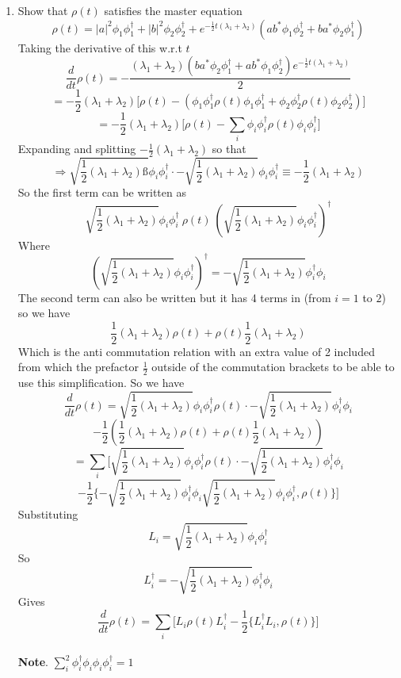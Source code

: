 \documentclass[12pt]{article}
\begin{document}
\begin{enumerate}
    \item Show that $\rho (t)$ satisfies the master equation 
    $$ \rho (t) = |a|^2 \phi_1 \phi_1^{\dagger} + |b|^2 \phi_2 \phi_2^{\dagger} + e^{-\frac{1}{2} t(\lambda_1 + \lambda_2)}(ab^* \phi_1 \phi_2^{\dagger}+ba^*\phi_2 \phi_1^{\dagger}) $$
    Taking the derivative of this w.r.t $t$ 
    $$ \frac{d}{dt} \rho (t) = - \frac{(\lambda_1 + \lambda_2)(ba^* \phi_2 \phi_1^{\dagger} + ab^* \phi_1 \phi_2^{\dagger})e^{-\frac{1}{2} t(\lambda_1 + \lambda_2)}}{2} $$
    $$ = - \frac{1}{2} (\lambda_1 + \lambda_2) \Big[ \rho (t) - (\phi_1 \phi_1^{\dagger} \rho (t) \phi_1 \phi_1^{\dagger} + \phi_2 \phi_2^{\dagger} \rho (t) \phi_2 \phi_2^{\dagger})\Big] $$
    $$ = - \frac{1}{2} (\lambda_1 + \lambda_2) \Big[ \rho (t) - \sum_i \phi_i \phi_i^{\dagger} \rho (t) \phi_i \phi_i^{\dagger} \Big] $$
    Expanding and splitting $- \frac{1}{2} (\lambda_1 + \lambda_2)$ so that 
    $$ \Rightarrow \sqrt{\frac{1}{2} (\lambda_1 + \lambda_2)ß} \phi_i \phi_i^{\dagger} \cdot -\sqrt{\frac{1}{2} (\lambda_1 + \lambda_2)} \phi_i \phi_i^{\dagger} \equiv - \frac{1}{2} (\lambda_1 + \lambda_2)$$
    So the first term can be written as 
    $$ \sqrt{\frac{1}{2} (\lambda_1 + \lambda_2)} \phi_i \phi_i^{\dagger} \ \rho (t) \ (\sqrt{\frac{1}{2} (\lambda_1 + \lambda_2)} \phi_i \phi_i^{\dagger})^{\dagger} $$
    Where 
    $$ (\sqrt{\frac{1}{2} (\lambda_1 + \lambda_2)} \phi_i \phi_i^{\dagger})^{\dagger} = -\sqrt{\frac{1}{2} (\lambda_1 + \lambda_2)} \phi_i^{\dagger} \phi_i $$
    The second term can also be written but it has 4 terms in (from $i=1$ to $2$) so we have 
    $$ \frac{1}{2} (\lambda_1 + \lambda_2) \rho (t) + \rho (t) \frac{1}{2} (\lambda_1 + \lambda_2) $$ 
    Which is the anti commutation relation with an extra value of 2 included from which the prefactor $\frac{1}{2}$ outside of the commutation brackets to be able to use this simplification. So we have 
    $$ \frac{d}{dt} \rho (t) = \sqrt{\frac{1}{2} (\lambda_1 + \lambda_2)} \phi_i \phi_i^{\dagger} \rho (t) \cdot -\sqrt{\frac{1}{2} (\lambda_1 + \lambda_2)} \phi_i^{\dagger}\phi_i $$
    $$ - \frac{1}{2}(\frac{1}{2} (\lambda_1 + \lambda_2) \rho(t) + \rho (t) \frac{1}{2} (\lambda_1 + \lambda_2)) $$
    $$ = \sum_i \Big[ \sqrt{\frac{1}{2} (\lambda_1 + \lambda_2)} \phi_i \phi_i^{\dagger} \rho (t) \cdot -\sqrt{\frac{1}{2} (\lambda_1 + \lambda_2)} \phi_i^{\dagger}\phi_i $$
    $$ - \frac{1}{2}\{-\sqrt{\frac{1}{2} (\lambda_1 + \lambda_2)} \phi_i^{\dagger} \phi_i \sqrt{\frac{1}{2} (\lambda_1 + \lambda_2)} \phi_i \phi_i^{\dagger}, \rho (t) \} \Big]$$
    Substituting 
    $$ L_i = \sqrt{\frac{1}{2} (\lambda_1 + \lambda_2)} \phi_i  \phi_i^{\dagger} $$
    So 
    $$ L_i^{\dagger} =  -\sqrt{\frac{1}{2} (\lambda_1 + \lambda_2)} \phi_i^{\dagger} \phi_i $$
    Gives 
    $$ \frac{d}{dt} \rho (t) = \sum_i \Big[ L_i \rho (t) L_i^{\dagger} - \frac{1}{2} \{L_i^{\dagger}L_i, \rho (t)\}\Big] $$
    \\
    \textbf{Note}. $ \sum_i^2 \phi_i^{\dagger} \phi_i \phi_i \phi_i^{\dagger} = 1$



\end{enumerate}
\end{document}
